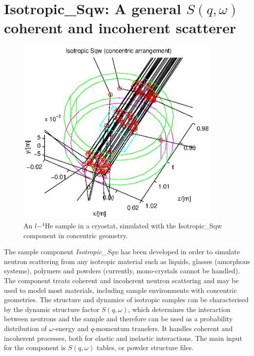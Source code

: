 \section{Isotropic\_Sqw: A general $S(q,\omega)$ coherent and incoherent scatterer}
\label{s:isotropic-sqw}


\begin{figure}
  \begin{center}
    \includegraphics[width=0.9\textwidth]{figures/sqw.eps}
  \end{center}
\caption{An $l-^4$He sample in a cryostat, simulated with the Isotropic\_Sqw component in concentric geometry.}
\label{f:isotropic-sqw}
\end{figure}

The sample component \emph{Isotropic\_Sqw} has been developed in order to simulate neutron scattering from any isotropic material such as liquids, glasses (amorphous systems), polymers and powders (currently, mono-crystals cannot be handled).
The component treats coherent and incoherent neutron scattering and may be used to model most materials, including sample environments with concentric geometries.
The structure and dynamics of isotropic samples can be characterised by the dynamic structure factor $S(q,\omega)$, which determines the interaction between neutrons and the sample and therefore can be used as a probability distribution of $\omega$-energy and $q$-momentum transfers. It handles coherent and incoherent processes, both for elastic and inelastic interactions.
The main input for the component is $S(q,\omega)$ tables, or powder structure files.

